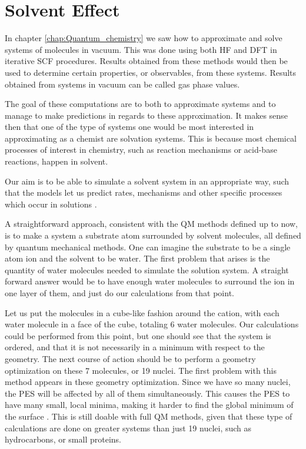 \documentclass[../Thesis.tex]{subfiles}
\begin{document}
\chapter{Solvent Effect}\label{chap:Solvent_effect}
In chapter \ref{chap:Quantum_chemistry} we saw how to approximate and
solve systems of molecules in vacuum. This was done using both \ac{HF} and \ac{DFT}
in iterative \ac{SCF} procedures. Results obtained from these methods would then
be used to determine certain properties, or observables, from these systems. Results
obtained from systems in vacuum can be called gas phase values.

The goal of these computations are to both to approximate systems and to manage to
make predictions in regards to these approximation. It makes sense then that one
of  the type of systems one would be most interested in approximating as a chemist
are solvation systems. This is because most chemical processes of interest in
chemistry, such as reaction mechanisms or acid-base reactions, happen in
solvent.

Our aim is to be able to simulate a solvent system in an appropriate way, such that
the models let us predict rates, mechanisms and other specific processes which
occur in solutions \cite{Tomasi:1994wt}.

A straightforward approach, consistent with the \ac{QM} methods defined up to now,
is to make a system a substrate atom surrounded by solvent molecules, all defined
by quantum mechanical methods. One can imagine the substrate to be a single atom
ion and the solvent to be water.  The first problem that arises is the quantity of
water molecules needed to simulate the solution system. A straight forward answer would
be to have enough water molecules to surround  the ion in one layer of them,
and just do our calculations from that point.

Let us put the molecules in a cube-like fashion around the cation, with each
water molecule in a face of the cube, totaling 6 water molecules. Our calculations
could be performed from this point, but one should see that the system is ordered,
and that it is not necessarily in a minimum with respect to the geometry. The
next course of action should be to perform a geometry optimization on these 7
molecules, or 19 nuclei. The first problem with this method appears in these
geometry optimization. Since we have so many nuclei, the \ac{PES} will be affected
by all of them simultaneously. This causes the \ac{PES} to have many small, local
minima, making it harder to find the global minimum of the surface \cite{Cramer:2004}. This is still
doable with full \ac{QM} methods, given that these type of calculations are done
on greater systems than just 19 nuclei, such as hydrocarbons, or small proteins.
\end{document}
